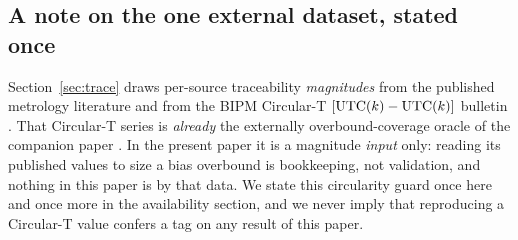 \subsection{A note on the one external dataset, stated once}
\label{sec:datasetnote}

Section~\ref{sec:trace} draws per-source traceability \emph{magnitudes} from the
published metrology literature and from the BIPM Circular-T
$[\mathrm{UTC}(k){}-\mathrm{UTC}(k){}]$ bulletin \citep{bipmcirculart,defraigne2015,panfilo2019}. That
Circular-T series is \emph{already} the externally \Validated{} overbound-coverage
oracle of the companion paper \citep{baweja2026cti}. In the present paper it is a
\Cited{} magnitude \emph{input} only: reading its published values to size a bias
overbound is bookkeeping, not validation, and nothing in this paper is
\Validated{} by that data. We state this circularity guard once here and once more
in the availability section, and we never imply that reproducing a Circular-T
value confers a \Validated{} tag on any result of this paper.
